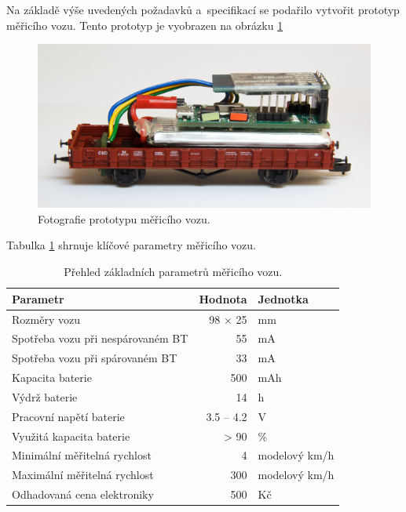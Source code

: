 Na základě výše uvedených požadavků a~specifikací se podařilo vytvořit prototyp
měřicího vozu. Tento prototyp je vyobrazen na obrázku \ref{fig:vuz-photo}

\begin{figure}[h]
\includegraphics[width=\textwidth]{data/wsm_3d.jpg}
\caption{Fotografie prototypu měřicího vozu.}
\label{fig:vuz-photo}
\end{figure}

Tabulka \ref{tab:wsm-params} shrnuje klíčové parametry měřicího vozu.

\begin{table}
	\begin{tabularx}{\textwidth}{lrl}
		\toprule
		Parametr & Hodnota & Jednotka \\
		\midrule
		Rozměry vozu\footnote & 98 $\times$ 25 & mm \\
		Spotřeba vozu při nespárovaném BT & 55 & mA \\
		Spotřeba vozu při spárovaném BT & 33 & mA \\
		Kapacita baterie & 500 & mAh \\
		Výdrž baterie & 14 & h \\
		Pracovní napětí baterie & 3.5 -- 4.2 & V \\
		Využitá kapacita baterie & > 90 & \% \\
		Minimální měřitelná rychlost & 4 & modelový km/h\\
		Maximální měřitelná rychlost\footnote & 300 & modelový
		km/h\\
		Odhadovaná cena elektroniky & 500 & Kč\\
		\bottomrule
	\end{tabularx}
	\caption{Přehled základních parametrů měřicího vozu.}
	\label{tab:wsm-params}
\end{table}

